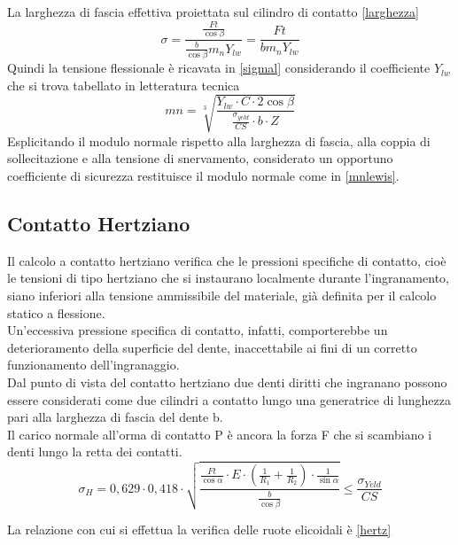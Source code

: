 \documentclass[%
corpo=11pt,
twoside,
 stile=classica,
oldstyle,
greek,%
]{toptesi}
\begin{document}
	La larghezza di fascia effettiva proiettata sul cilindro di contatto \ref{larghezza}
	\begin{equation}\label{sigmal}
	\sigma=\frac{\frac{Ft}{\cos\beta}}{\frac{b}{\cos\beta}m_{n}Y_{lw}}=\frac{Ft}{b m_{n}Y_{lw}}
	\end{equation}
	Quindi la tensione flessionale è ricavata in \ref{sigmal} considerando il coefficiente $Y_{lw}$ che si trova tabellato in letteratura tecnica
		\begin{equation}\label{mnlewis}
	mn=\sqrt[3]{\frac{Y_{lw} \cdot C \cdot 2 \cos\beta}{\frac{\sigma_{yeld}}{CS} \cdot b \cdot Z}}
	\end{equation}
	Esplicitando il modulo normale rispetto alla larghezza di fascia, alla coppia di sollecitazione e alla tensione di snervamento, considerato un opportuno coefficiente di sicurezza restituisce il modulo normale come in \ref{mnlewis}.
	\subsection{Contatto Hertziano}
	Il calcolo a contatto hertziano verifica che le pressioni specifiche di contatto, cioè le tensioni di tipo hertziano che si instaurano localmente durante l’ingranamento, siano inferiori alla tensione ammissibile del materiale, già definita per il calcolo statico a flessione.\\
	Un’eccessiva pressione specifica di contatto, infatti, comporterebbe un deterioramento della superficie del dente, inaccettabile ai fini di un corretto funzionamento dell’ingranaggio.\\
	Dal punto di vista del contatto hertziano due denti diritti che ingranano possono essere considerati come due cilindri a contatto lungo una generatrice di lunghezza pari alla larghezza di fascia del dente b. \\
	Il carico normale all’orma di contatto P è ancora la forza F che si scambiano i denti lungo la retta dei contatti. 
	\begin{equation}\label{hertz}
	\sigma_{H}=0,629\cdot0,418\cdot\sqrt{\frac{\frac{Ft}{\cos\alpha}\cdot E\cdot(\frac{1}{R_{1}}+\frac{1}{R_{2}})\cdot \frac{1}{\sin\alpha}}{\frac{b}{\cos\beta}}}\leq \frac{\sigma_{Yeld}}{CS}
	\end{equation}
	
	La relazione con cui si effettua la verifica delle ruote elicoidali è \ref{hertz}
	
\end{document}
